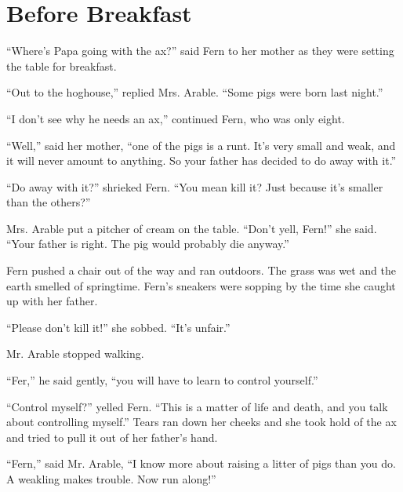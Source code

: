 \documentclass[a4paper, oneside]{book}
\begin{document}
 \tableofcontents


 \chapter{Before Breakfast}

 
``Where's Papa going with the ax?'' said Fern to her mother as they  
were setting the table for breakfast.                                  

 ``Out to the hoghouse,'' replied Mrs. Arable. ``Some pigs were born
last night.''                                                        

 ``I don't see why he needs an ax,'' continued Fern, who was only
eight.

 ``Well,'' said her mother, ``one of the pigs is a runt. It's very small 
and weak, and it will never amount to anything. So your father has
decided to do away with it.''                                          

``Do away with it?'' shrieked Fern. ``You mean kill it? Just because  
it's smaller than the others?''

 Mrs. Arable put a pitcher of cream on the table. ``Don't yell,
Fern!'' she said. ``Your father is right. The pig would probably die
anyway.'' 

Fern pushed a chair out of the way and ran outdoors. The grass 
was wet and the earth smelled of springtime. Fern's sneakers were           
sopping by the time she caught up with her father.                           

 ``Please don't kill it!'' she sobbed. ``It's unfair.''                         
 
Mr. Arable stopped walking.

 ``Fer,'' he said gently, ``you will have to learn to control yourself.''
 
 ``Control myself?'' yelled Fern. ``This is a matter of life and death,
and you talk about controlling myself.'' Tears ran down her cheeks
and she took hold of the ax and tried to pull it out of her father's
hand.

 ``Fern,'' said Mr. Arable, ``I know more about raising a litter of pigs
than you do. A weakling makes trouble. Now run along!''
\end{document}
